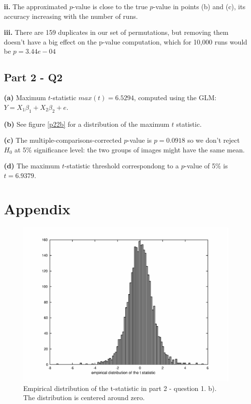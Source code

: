 \documentclass[11pt,a4paper,oneside]{report}
\begin{document}
\textbf{ii. } The approximated $p$-value is close to the true $p$-value in points (b) and (c), its accuracy increasing with the number of runs.

\textbf{iii. } There are 159 duplicates in our set of permutations, but removing them doesn't have a big effect on the p-value computation, which for 10,000 runs would be $p=3.44e-04$\\

\subsection*{Part 2 - Q2}

\noindent \large{\textbf{(a)}} Maximum $t$-statistic $max(t) = 6.5294$, computed using the GLM: $Y = X_1 \beta_1 + X_2 \beta_2 + e$.

\noindent \large{\textbf{(b)}} See figure \ref{p22b} for a distribution of the maximum $t$ statistic.

\noindent \large{\textbf{(c)}} The multiple-comparisons-corrected $p$-value is $p = 0.0918$ so we don't reject $H_0$ at 5\% significance level: the two groups of images might have the same mean.

\noindent \large{\textbf{(d)}} The maximum $t$-statistic threshold correspondong to a $p$-value of 5\% is $t = 6.9379$.

\clearpage

\section*{Appendix}

\begin{figure}[H]
\centering
 \includegraphics[scale = 0.7]{figures/p21_b.eps}
 \caption{Empirical distribution of the t-statistic in part 2 - question 1. b). The distribution is centered around zero.}
 \label{p21b}
\end{figure}
\end{document}
